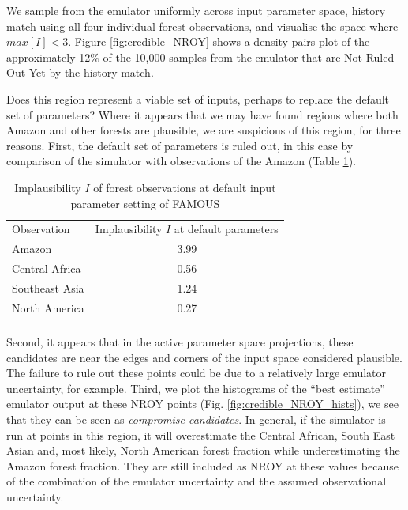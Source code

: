 \documentclass[esd, article]{copernicus} %
\begin{document}
We sample from the emulator uniformly across input parameter space, history match using all four individual forest observations, and visualise the space where $max[I] < 3$. Figure \ref{fig:credible_NROY} shows a density pairs plot of the approximately 12\% of the 10,000 samples from the emulator that are Not Ruled Out Yet by the history match.


Does this region represent a viable set of inputs, perhaps to replace the default set of parameters? Where it appears that we may have found regions where both Amazon and other forests are plausible, we are suspicious of this region, for three reasons. First, the default set of parameters is ruled out, in this case by comparison of the simulator with observations of the Amazon (Table \ref{tab:default_parameter_implausibility}).


\begin{table}[t]
\caption{Implausibility $I$ of forest observations at default input parameter setting of FAMOUS}\label{tab:default_parameter_implausibility}
\begin{tabular}{lc}

\tophline
Observation &  Implausibility $I$ at default parameters \\
Amazon & 3.99 \\
Central Africa & 0.56 \\
Southeast Asia & 1.24 \\
North America & 0.27 \\
\bottomhline
\end{tabular}
\belowtable{} %
\end{table}

Second, it appears that in the active parameter space projections, these candidates are near the edges and corners of the input space considered plausible. The failure to rule out these points could be due to a relatively large emulator uncertainty, for example. Third, we plot the histograms of the ``best estimate'' emulator output at these NROY points (Fig.  \ref{fig:credible_NROY_hists}), we see that they can be seen as \emph{compromise candidates}. In general, if the simulator is run at points in this region, it will overestimate the Central African, South East Asian and, most likely, North American forest fraction while underestimating the Amazon forest fraction. They are still included as NROY at these values because of the combination of the emulator uncertainty and the assumed observational uncertainty.
\end{document}
